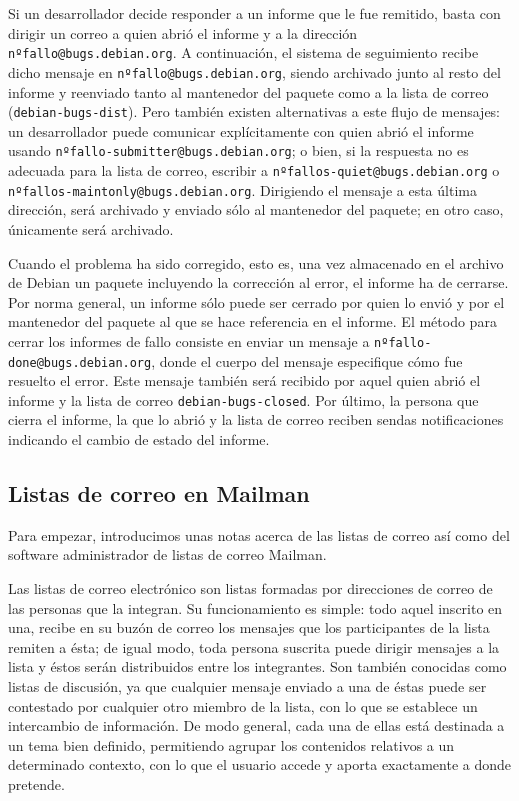 Si un desarrollador decide responder a un informe que le fue remitido, basta
con dirigir un correo a quien abrió el informe y a la dirección
\texttt{nºfallo@bugs.debian.org}. A continuación, el sistema de seguimiento
recibe dicho mensaje en \texttt{nºfallo@\-bugs.debian.org}, siendo archivado
junto al resto del informe y reenviado tanto al mantenedor del paquete como
a la lista de correo (\texttt{debian-bugs-dist}). Pero también existen
alternativas a este flujo de mensajes: un desarrollador puede comunicar
explícitamente con quien abrió el informe usando
\texttt{nºfallo-submitter@\-bugs.debian.org};
o bien, si la respuesta no es adecuada para la lista de correo, escribir a
\texttt{nºfallos\--quiet@\-bugs.debian.org} o
\texttt{nºfallos\--maintonly@\-bugs.debian.org}. Dirigiendo el mensaje a esta
última dirección, será archivado y enviado sólo al mantenedor del paquete;
en otro caso, únicamente será archivado.

Cuando el problema ha sido corregido, esto es, una vez almacenado en el archivo
de Debian un paquete incluyendo la corrección al error, el informe ha de
cerrarse. Por norma general, un informe sólo puede ser cerrado por quien lo
envió y por el mantenedor del paquete al que se hace referencia en el informe.
El método para cerrar los informes de fallo consiste en enviar un mensaje a
\texttt{nºfallo-done@\-bugs.debian.org}, donde el cuerpo del mensaje especifique
cómo fue resuelto el error. Este mensaje también será recibido por aquel quien
abrió el informe y la lista de correo \texttt{debian-bugs-closed}. Por último,
la persona que cierra el informe, la que lo abrió y la lista de correo reciben
sendas notificaciones indicando el cambio de estado del informe.


\subsection{Listas de correo en Mailman} \label{intro_listas}
Para empezar, introducimos unas notas acerca de las listas de correo así como
del software administrador de listas de correo Mailman.

Las listas de correo electrónico son listas formadas por direcciones de correo
de las personas que la integran. Su funcionamiento es simple: todo aquel
inscrito en una, recibe en su buzón de correo los mensajes que los participantes
de la lista remiten a ésta; de igual modo, toda persona suscrita puede dirigir
mensajes a la lista y éstos serán distribuidos entre los integrantes.
Son también conocidas como listas de discusión, ya que cualquier mensaje
enviado a una de éstas puede ser contestado por cualquier otro miembro
de la lista, con lo que se establece un intercambio de información.
De modo general, cada una de ellas está destinada a un tema bien definido,
permitiendo agrupar los contenidos relativos a un determinado contexto,
con lo que el usuario accede y aporta exactamente a donde pretende.

